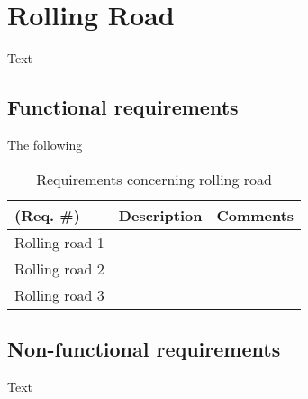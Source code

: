 \section{Rolling Road}
Text

\subsection{Functional requirements}
The following 

\begin{table}[h!]
	\centering
	\label{my-label}
	\begin{tabular}{|p{3 cm}|p{4 cm}|p{3 cm}|}
	\hline
	\textbf{(Req. \#)} & \textbf{Description} & \textbf{Comments} \\\hline
	Rolling road 1	&  &  \\\hline
	Rolling road 2	&  &   \\\hline
	Rolling road 3	&  &   \\\hline
	\end{tabular}
	\caption{Requirements concerning rolling road}
\end{table}

\subsection{Non-functional requirements}
Text
